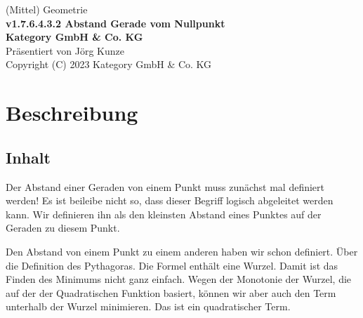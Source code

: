 \documentclass[a4paper]{amsart}
\theoremstyle{definition}
\begin{document}
\begin{titlepage}
\centering
{\huge
(Mittel) Geometrie\\[1cm]
\textbf{v1.7.6.4.3.2 Abstand Gerade vom Nullpunkt}
}\\[1cm]

\textbf{Kategory GmbH \& Co. KG}\\
Präsentiert von Jörg Kunze\\
Copyright (C) 2023 Kategory GmbH \& Co. KG

\end{titlepage}

%

\newpage

\section*{Beschreibung}

\subsection*{Inhalt}
Der Abstand einer Geraden von einem Punkt muss zunächst mal definiert werden! Es ist beileibe nicht so, dass dieser Begriff logisch abgeleitet werden kann. Wir definieren ihn als den kleinsten Abstand eines Punktes auf der Geraden zu diesem Punkt.

Den Abstand von einem Punkt zu einem anderen haben wir schon definiert. Über die Definition des Pythagoras. Die Formel enthält eine Wurzel. Damit ist das Finden des Minimums nicht ganz einfach. Wegen der Monotonie der Wurzel, die auf der der Quadratischen Funktion basiert, können wir aber auch den Term unterhalb der Wurzel minimieren. Das ist ein quadratischer Term.
\end{document}
